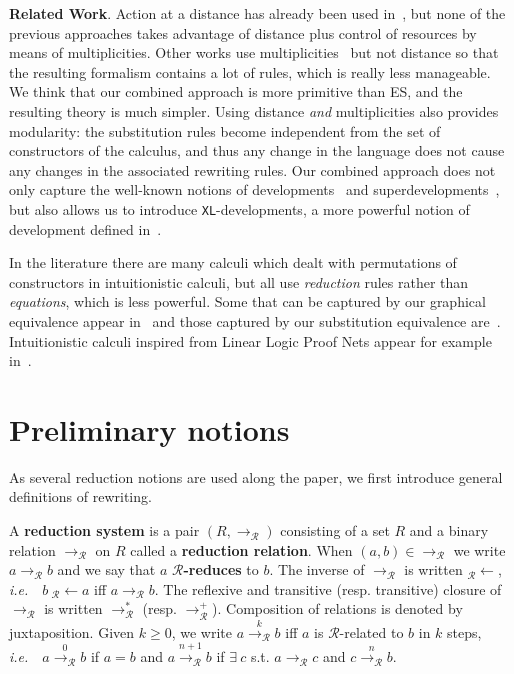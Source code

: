 \documentclass{LMCS}
\newcommand{\ie}{{\it  i.e.}~}
\renewcommand{\>}{\rightarrow}
\newcommand{\Rew}[1]{\rightarrow_{#1}}
\newcommand{\Rewn}[2][*]{\rightarrow^{#1}_{#2}}
\newcommand{\R}{\mathcal{R}}
\newcommand{\Rewplus}[1]{\rightarrow^{+}_{#1}}
\newcommand{\LRew}[1]{\mbox{}_{#1}{\leftarrow} }
\newcommand{\Rewnumber}[2]{\stackrel{#1}{\rightarrow_{#2}}}
\newcommand{\deft}[1]{{\bf #1}}
\newcommand{\development}{development}
\newcommand{\supersuperdevelopment}{{\tt XL}-\development}
\begin{document}
\deft{Related Work}.  Action at a distance has already been used
in~\cite{Milner07,deBruijn87,Ned92}, but none of the previous
approaches takes advantage of distance plus control of resources by
means of multiplicities.  Other works use multiplicities~\cite{KR09}
but not distance so that the resulting formalism contains a lot of
rules, which is really less manageable.  We think that our combined
approach is more primitive than ES, and the resulting theory is much
simpler.  Using distance \textit{and} multiplicities also provides
modularity: the substitution rules become independent from the set of
constructors of the calculus, and thus any change in the language does
not cause any changes in the associated rewriting rules. Our combined
approach does not only capture the well-known notions of
developments~\cite{Hindley78} and superdevelopments~\cite{KvOvR93}, but also allows us to
introduce \supersuperdevelopment s, a more powerful
notion of development defined in~\cite{AK10}.

In the literature there are many calculi which dealt with permutations
of constructors in intuitionistic calculi, but all use \textit{reduction} rules
rather than \textit{equations}, which is less powerful. 
Some  that can be captured by our graphical equivalence appear
in~\cite{Kamareddine00, regnier94,KfouryW95}
and those captured by our substitution equivalence
are~\cite{espiritoSanto2011,HZ09,Yoshida93}.
Intuitionistic calculi inspired from Linear Logic Proof Nets
appear for example in~\cite{KL05,Kes09,KR09}.

\section{Preliminary notions}
\label{sec:general-notion}

As several reduction notions are used along the paper, we first
introduce general definitions of rewriting. \medskip 

A \deft{reduction system} is a pair $(R, \Rew{\R})$ consisting of a set $R$
and a binary relation $\Rew{\R}$ on $R$ called a \deft{reduction relation}. When $(a,b) \in \Rew{\R}$ we write
$a \Rew{\R} b$ and we say that $a$ \deft{$\R$-reduces} to $b$. 
The inverse of $\Rew{\R}$ is written
$\LRew{\R}$, \ie\ $b\ \LRew{\R} a$ iff
$a \Rew{\R} b$. The reflexive and transitive (resp. transitive) closure
of $\Rew{\R}$ is written $\Rewn{\R}$ (resp. $\Rewplus{\R}$). Composition
of relations is denoted by juxtaposition. 
 Given $k \geq 0$, we write $a \Rewnumber{k}{\R} b$ iff 
$a$ is $\R$-related to $b$ in $k$ steps, \ie\ $a \Rewnumber{0}{\R}
  b$ if $a=b$ and $a \Rewnumber{n+1}{\R} b$ if $\exists\ c$ s.t.  $a
  \Rew{\R} c$ and $c \Rewnumber{n}{\R} b$. 
\end{document}

